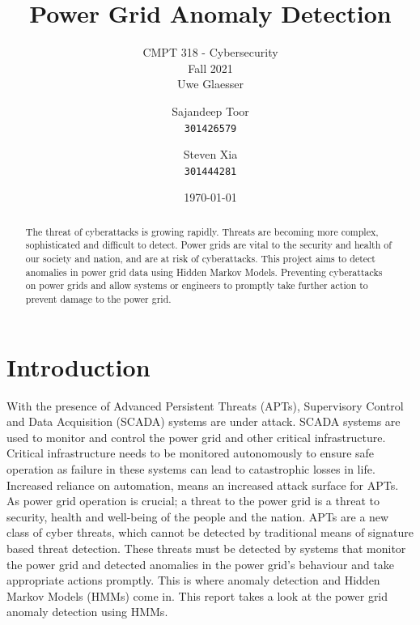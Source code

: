 \documentclass[11pt]{article}
\title{Power Grid Anomaly Detection}
\subtitle{CMPT 318 - Cybersecurity \\ Fall 2021 \\ Uwe Glaesser}
\author{    
    Sajandeep Toor\\
    \texttt{301426579}
    \and 
    Steven Xia\\
    \texttt{301444281}
}
\date{\today}
\begin{document}
\maketitle 
\vspace{5em}

\doublespacing %

\begin{abstract}
  The threat of cyberattacks is growing rapidly.
  Threats are becoming more complex, sophisticated and difficult to detect. 
  Power grids are vital to the security and health of our society and nation, and 
  are at risk of cyberattacks.
  This project aims to detect anomalies in power grid data using Hidden Markov 
  Models. 
  Preventing cyberattacks on power grids and allow systems or engineers to promptly
  take further action to prevent damage to the power grid.
\end{abstract}

\pagebreak

\singlespacing %
\tableofcontents

\pagebreak

\renewcommand{\listfigurename}{Table of Figures}
\listoffigures

\pagebreak

\doublespacing %

\section{Introduction}
With the presence of Advanced Persistent Threats (APTs), Supervisory Control and 
Data Acquisition (SCADA) systems are under attack. 
SCADA systems are used to monitor and control the power grid and other critical 
infrastructure.
Critical infrastructure needs to be monitored autonomously to ensure safe operation
as failure in these systems can lead to catastrophic losses in life.
Increased reliance on automation, means an increased attack surface for APTs.
As power grid operation is crucial; a threat to the power grid is a threat to
security, health and well-being of the people and the nation. 
APTs are a new class of cyber threats, which cannot be detected by traditional 
means of signature based threat detection. 
These threats must be detected by systems that monitor the power grid and 
detected anomalies in the power grid's behaviour and take appropriate actions 
promptly.
This is where anomaly detection and Hidden Markov Models (HMMs) come in.
This report takes a look at the power grid anomaly detection using HMMs.
\end{document}
